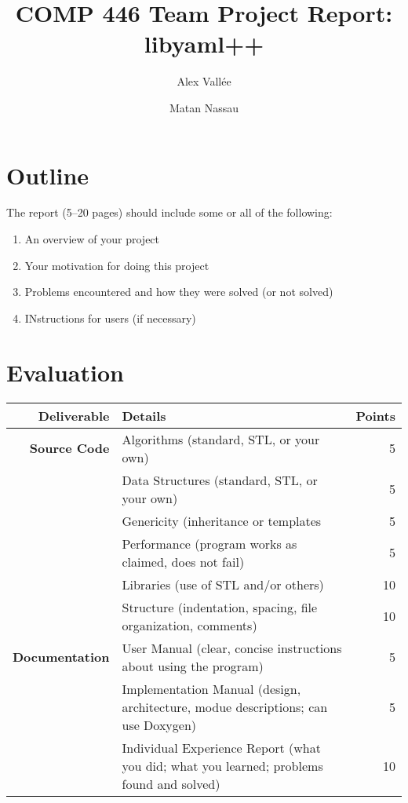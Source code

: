 \documentclass{article}
\author{Alex Vall\'ee \and Matan Nassau}
\title{COMP 446 Team Project Report:  libyaml++}
\begin{document}
\maketitle

\section{Outline}
The report (5--20 pages) should include some or all of the following:

\begin{enumerate}
  \item An overview of your project
  \item Your motivation for doing this project
  \item Problems encountered and how they were solved (or not solved)
  \item INstructions for users (if necessary)
\end{enumerate}

\section{Evaluation}
\vspace{2em}

\begin{tabular}{rp{40ex}r}
  \hline
  \textbf{Deliverable} & \textbf{Details} & \textbf{Points} \\
  \hline
  \textbf{Source Code} & Algorithms (standard, STL, or your own) & 5 \\
  & Data Structures (standard, STL, or your own) & 5 \\
  & Genericity (inheritance or templates & 5 \\
  & Performance (program works as claimed, does not fail) & 5 \\
  & Libraries (use of STL and/or others) & 10 \\
  & Structure (indentation, spacing, file organization, comments) & 10 \\
  \textbf{Documentation} & User Manual (clear, concise instructions about using the program) & 5 \\
  & Implementation Manual (design, architecture, modue descriptions; can use Doxygen) & 5 \\
  & Individual Experience Report (what you did; what you learned; problems found and solved) & 10 \\
  \hline
\end{tabular}
\end{document}
